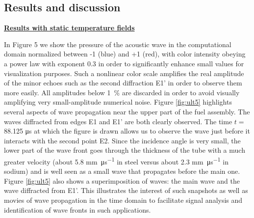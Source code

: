     \subsection{Results and discussion} \label{ssec:2dgrf_res}

        \underline{\textbf{Results with static temperature fields}}

            In Figure 5 we show the pressure of the acoustic wave in the computational domain normalized between -1 (blue) and +1 (red), with color intensity
obeying a power law with exponent 0.3 in order to significantly enhance small values for visualization purposes. Such a nonlinear color scale amplifies the
real amplitude of the minor echoes such as the second diffraction E1' in order to observe them more easily. All amplitudes below \SI{1}{\percent} are discarded
in order to avoid visually amplifying very small-amplitude numerical noise. Figure \ref{fig:ult5} highlights several aspects of wave propagation near the upper
part of the fuel assembly. The waves diffracted from edges E1 and E1' are both clearly observed.
            The time $t =$ 88.125 \si{\micro\second} at which the figure is drawn allows us to observe the wave just before it interacts with the second point
E2. Since the incidence angle is very small, the lower part of the wave front goes through the thickness of the tube with a much greater velocity (about 5.8
\si{\milli\meter\per\micro\second} in steel versus about 2.3 \si{\milli\meter\per\micro\second} in sodium) and is well seen as a small wave that propagates
before the main one. Figure \ref{fig:ult5} also shows a superimposition of waves: the main wave and the wave diffracted from E1'. This illustrates the interest
of such snapshots as well as movies of wave propagation in the time domain to facilitate signal analysis and identification of wave fronts in such applications.

